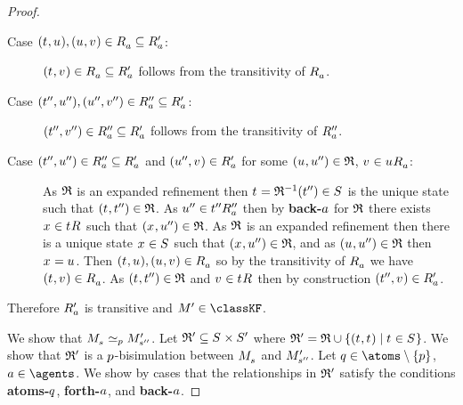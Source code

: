 \begin{proof}
\begin{description}
    \item[Case $(\kStateT, \kStateU), (\kStateU, \kStateV) \in \kAccessibilityA \subseteq \kAccessibilityPA$:] \hfill
        $(\kStateT, \kStateV) \in \kAccessibilityA \subseteq \kAccessibilityPA$ follows from the transitivity of $\kAccessibilityA$.
    \item[Case $({t}^{\prime\prime}, {u}^{\prime\prime}), ({u}^{\prime\prime}, {v}^{\prime\prime}) \in {R^{\prime\prime}_{a}} \subseteq {R^{\prime}_{a}}$:] \hfill
        $({t}^{\prime\prime}, {v}^{\prime\prime}) \in {R^{\prime\prime}_{a}} \subseteq {R^{\prime}_{a}}$ follows from the transitivity of ${R^{\prime\prime}_{a}}$.
    \item[Case $({t}^{\prime\prime}, {u}^{\prime\prime}) \in {R^{\prime\prime}_{a}} \subseteq {R^{\prime}_{a}}$ and $(\kStateUPP, \kStateV) \in \kAccessibilityPA$ for some $(\kStateU, \kStateUPP) \in \refinement$, $\kStateV \in \kSuccessorsA{\kStateU}$:]
        As $\mathfrak{R}$ is an expanded refinement then $\kStateT = \refinement^{-1}(\kStateTPP) \in \kStates$ is the unique state such that $(\kStateT, \kStateTPP) \in \refinement$.
        As ${u}^{\prime\prime} \in {{t}^{\prime\prime}} {R^{\prime\prime}_{a}}$ then by {\bf back-$a$} for $\mathfrak{R}$ there exists $\kStateX \in \kSuccessors{}{\kStateT}$ such that $(\kStateX, \kStateUPP) \in \refinement$.
        As $\mathfrak{R}$ is an expanded refinement then there is a unique state $\kStateX \in \kStates$ such that $(\kStateX, \kStateUPP) \in \refinement$, and as $(\kStateU, \kStateUPP) \in \refinement$ then $\kStateX = \kStateU$.
        Then $(\kStateT, \kStateU), (\kStateU, \kStateV) \in \kAccessibilityA$ so by the transitivity of $\kAccessibilityA$ we have $(\kStateT, \kStateV) \in \kAccessibilityA$.
        As $(\kStateT, \kStateTPP) \in \refinement$ and $\kStateV \in \kSuccessors{}{\kStateT}$ then by construction $(\kStateTPP, \kStateV) \in \kAccessibilityPA$.
\end{description}

Therefore ${R^{\prime}_{a}}$ is transitive and $\kModelP \in \classKF$.

We show that $\kPModel{\kStateS} \bisimilar[\atomP] \kPModelP{\kStateSPP}$.
Let $\bisimulation' \subseteq \kStates \times \kStatesP$ where $\bisimulation' = \refinement \cup \{(\kStateT, \kStateT) \mid \kStateT \in \kStates\}$.
We show that $\mathfrak{R}'$ is a $p$-bisimulation between $\kPModel{\kStateS}$ and ${M^{\prime}_{{s}^{\prime\prime}}}$.
Let $\atomQ \in \atoms \setminus \{\atomP\}$, $\agentA \in \agents$.
We show by cases that the relationships in $\mathfrak{R}'$ satisfy the conditions {\bf atoms-$q$}, {\bf forth-$a$}, and {\bf back-$a$}.


\end{proof}
